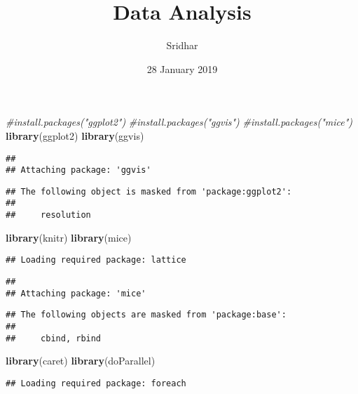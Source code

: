 \documentclass[]{article}
\title{Data Analysis}
\author{Sridhar}
\date{28 January 2019}
\newenvironment{Shaded}{\begin{snugshade}}{\end{snugshade}}
\newcommand{\KeywordTok}[1]{\textcolor[rgb]{0.13,0.29,0.53}{\textbf{#1}}}
\newcommand{\CommentTok}[1]{\textcolor[rgb]{0.56,0.35,0.01}{\textit{#1}}}
\newcommand{\NormalTok}[1]{#1}
\begin{document}
\maketitle

\begin{Shaded}
\begin{Highlighting}[]
\CommentTok{#install.packages("ggplot2")}
\CommentTok{#install.packages("ggvis")}
\CommentTok{#install.packages("mice")}
\KeywordTok{library}\NormalTok{(ggplot2)}
\KeywordTok{library}\NormalTok{(ggvis)}
\end{Highlighting}
\end{Shaded}

\begin{verbatim}
## 
## Attaching package: 'ggvis'
\end{verbatim}

\begin{verbatim}
## The following object is masked from 'package:ggplot2':
## 
##     resolution
\end{verbatim}

\begin{Shaded}
\begin{Highlighting}[]
\KeywordTok{library}\NormalTok{(knitr)}
\KeywordTok{library}\NormalTok{(mice)}
\end{Highlighting}
\end{Shaded}

\begin{verbatim}
## Loading required package: lattice
\end{verbatim}

\begin{verbatim}
## 
## Attaching package: 'mice'
\end{verbatim}

\begin{verbatim}
## The following objects are masked from 'package:base':
## 
##     cbind, rbind
\end{verbatim}

\begin{Shaded}
\begin{Highlighting}[]
\KeywordTok{library}\NormalTok{(caret)}
\KeywordTok{library}\NormalTok{(doParallel) }
\end{Highlighting}
\end{Shaded}

\begin{verbatim}
## Loading required package: foreach
\end{verbatim}
\end{document}
